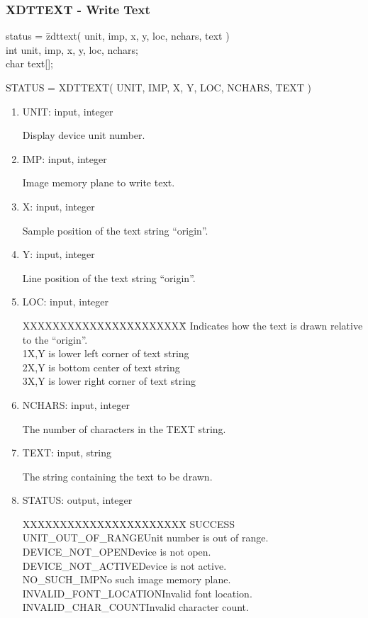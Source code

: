 \subsubsection{XDTTEXT - Write Text}
\begin{tabbing}
status = \=zdttext( unit, imp, x, y, loc, nchars, text )\\
\>int  unit, imp, x, y, loc, nchars;\\
\>char  text[];\\
\end{tabbing}
STATUS = XDTTEXT( UNIT, IMP, X, Y, LOC, NCHARS, TEXT )
\begin{enumerate}
\item UNIT:  input, integer

Display device unit number.
\item IMP:  input, integer

Image memory plane to write text.
\item X:  input, integer

Sample position of the text string ``origin''.
\item Y:  input, integer

Line position of the text string ``origin''.
\item LOC:  input, integer
\begin{tabbing}
XXXXXXXXXXXXXXXXXXXXXX\=\kill
Indicates how the text is drawn relative to the ``origin''.\\
1\>X,Y is lower left corner of text string\\
2\>X,Y is bottom center of text string\\
3\>X,Y is lower right corner of text string\\
\end{tabbing}
\item NCHARS:  input, integer

The number of characters in the TEXT string.
\item TEXT:  input, string

The string containing the text to be drawn.
\item STATUS:  output, integer
\begin{tabbing}
XXXXXXXXXXXXXXXXXXXXXX\=\kill
SUCCESS\\
UNIT\_OUT\_OF\_RANGE\>Unit number is out of range.\\
DEVICE\_NOT\_OPEN\>Device is not open.\\
DEVICE\_NOT\_ACTIVE\>Device is not active.\\
NO\_SUCH\_IMP\>No such image memory plane.\\
INVALID\_FONT\_LOCATION\>Invalid font location.\\
INVALID\_CHAR\_COUNT\>Invalid character count.\\
\end{tabbing}
\end{enumerate}
